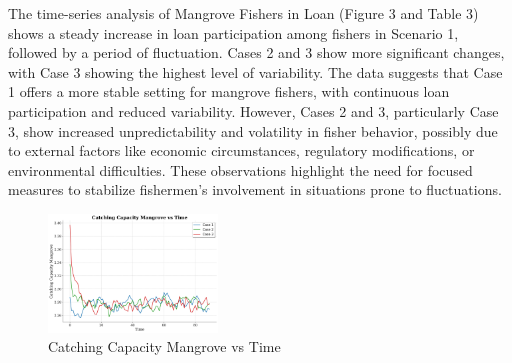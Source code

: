 \documentclass[final,5p,times,twocolumn,authoryear]{elsarticle}
\begin{document}
The time-series analysis of Mangrove Fishers in Loan (Figure 3 and Table 3) shows a steady increase in loan participation among fishers in Scenario 1, followed by a period of fluctuation. Cases 2 and 3 show more significant changes, with Case 3 showing the highest level of variability. The data suggests that Case 1 offers a more stable setting for mangrove fishers, with continuous loan participation and reduced variability. However, Cases 2 and 3, particularly Case 3, show increased unpredictability and volatility in fisher behavior, possibly due to external factors like economic circumstances, regulatory modifications, or environmental difficulties. These observations highlight the need for focused measures to stabilize fishermen's involvement in situations prone to fluctuations.\\
\begin{figure}[htbp]
    \centering
    \includegraphics[width=0.4\textwidth]{graph_all/plots_fav/catching_capacity_mangrove_vs_time.png}
    \caption{Catching Capacity Mangrove vs Time}
    \label{fig:catching_mangrove}
\end{figure}
\end{document}
